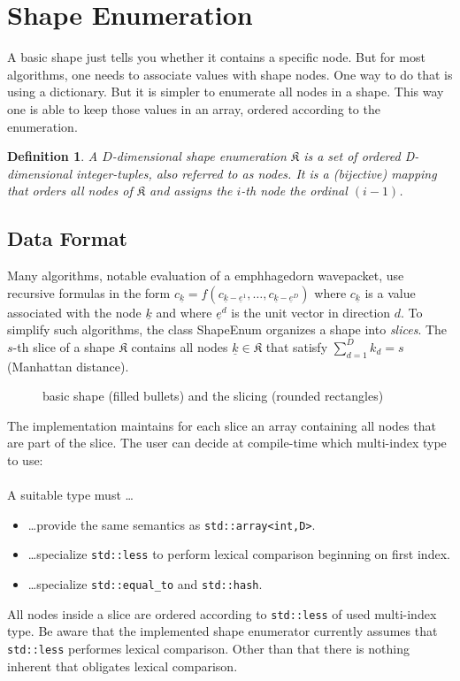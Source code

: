 \documentclass{article}
\def\code#1{\texttt{#1}}
\newtheorem{definition}{Definition}
\begin{document}
\section{Shape Enumeration}

A basic shape just tells you whether it contains a specific node. But
for most algorithms, one needs to associate values with shape nodes. One way to
do that is using a dictionary. But it is simpler to enumerate all nodes in a shape.
This way one is able to keep those values in an array, ordered according to the enumeration.

\begin{definition}
A \( D \)-dimensional shape enumeration \( \mathfrak{K} \) is a 
set of ordered D-dimensional integer-tuples, also referred to as \emph{nodes}. It is a (bijective) mapping that orders all nodes of \( \mathfrak{K} \) and assigns the \(i\)-th node the ordinal \( (i-1) \).
\end{definition}

\subsection{Data Format}
Many algorithms, notable evaluation of a emph{hagedorn wavepacket}, use recursive formulas in the form 
\( c_{\underline{k}} = f(c_{\underline{k}-\underline{e}^1}, \ldots, c_{\underline{k}-\underline{e}^D}) \)
where \( c_{\underline{k}} \) is a value associated with the node \( \underline{k} \)
and where \( \underline{e}^d \) is the unit vector in direction \( d \).
To simplify such algorithms, the class ShapeEnum organizes a shape into \emph{slices}. 
The \( s \)-th slice of a shape \( \mathfrak{K} \) contains all nodes \(
\underline{k} \in \mathfrak{K} \) that satisfy \( \sum_{d=1}^{D} k_d = s \) (Manhattan distance).

\begin{figure}[ht]
	\centering
	
	\caption{basic shape (filled bullets) and the slicing (rounded rectangles)}
\end{figure}

The implementation maintains for each slice an array containing all nodes that are part of the slice. The user can decide at compile-time which multi-index type to use:
 \\ \\ A suitable type must \dots
\begin{itemize}
\item \dots provide the same semantics as \code{std::array<int,D>}.
\item \dots specialize \code{std::less} to perform lexical comparison beginning on first index.
\item \dots specialize \code{std::equal\_to} and \code{std::hash}.
\end{itemize}
All nodes inside a slice are ordered according to \code{std::less} of used multi-index type. Be aware that the implemented shape enumerator currently assumes that \code{std::less} performes lexical comparison. Other than that there is nothing inherent that obligates lexical comparison.
\end{document}
